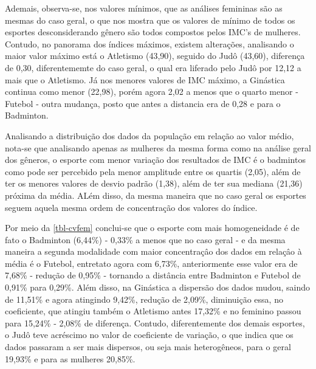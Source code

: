 \documentclass[
]{estat/estat}
\begin{document}
Ademais, observa-se, nos valores mínimos, que as análises femininas são
as mesmas do caso geral, o que nos mostra que os valores de mínimo de
todos os esportes desconsiderando gênero são todos compostos pelos IMC's
de mulheres. Contudo, no panorama dos índices máximos, existem
alterações, analisando o maior valor máximo está o Atletismo (43,90),
seguido do Judô (43,60), diferença de 0,30, diferentememte do caso
geral, o qual era liferado pelo Judô por 12,12 a mais que o Atletismo.
Já nos menores valores de IMC máximo, a Ginástica continua como menor
(22,98), porém agora 2,02 a menos que o quarto menor - Futebol - outra
mudança, posto que antes a distancia era de 0,28 e para o Badminton.

Analisando a distribuição dos dados da população em relação ao valor
médio, nota-se que analisando apenas as mulheres da mesma forma como na
análise geral dos gêneros, o esporte com menor variação dos resultados
de IMC é o badmintos como pode ser percebido pela menor amplitude entre
os quartis (2,05), além de ter os menores valores de desvio padrão
(1,38), além de ter sua mediana (21,36) próxima da média. ALém disso, da
mesma maneira que no caso geral os esportes seguem aquela mesma ordem de
concentração dos valores do índice.

\begin{table}[H]

\caption{\label{tbl-cvfem}Coeficiente de variação de IMC de atletas
femininas dos esportes de interesse}


\end{table}%

Por meio da \ref{tbl-cvfem} conclui-se que o esporte com mais
homogeneidade é de fato o Badminton (6,44\%) - 0,33\% a menos que no
caso geral - e da mesma maneira a segunda modalidade com maior
concentraçâo dos dados em relaçâo à média é o Futebol, entretato agora
com 6,73\%, anteriormente esse valor era de 7,68\% - redução de 0,95\% -
tornando a distância entre Badminton e Futebol de 0,91\% para 0,29\%.
Além disso, na Ginástica a dispersão dos dados mudou, saindo de 11,51\%
e agora atingindo 9,42\%, redução de 2,09\%, diminuição essa, no
coeficiente, que atingiu também o Atletismo antes 17,32\% e no feminino
passou para 15,24\% - 2,08\% de diferença. Contudo, diferentemente dos
demais esportes, o Judô teve acréscimo no valor de coeficiente de
variação, o que indica que os dados passaram a ser mais dispersos, ou
seja mais heterogêneos, para o geral 19,93\% e para as mulheres 20,85\%.
\end{document}
